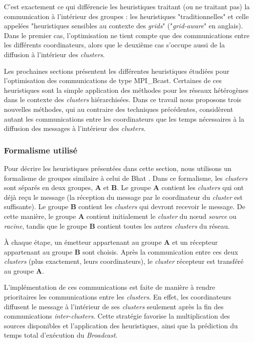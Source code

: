 C'est exactement ce qui différencie les heuristiques traitant (ou
ne traitant pas) la communication à l'intérieur des groupes : les
heuristiques "traditionnelles" et celle appelées "heuristiques
sensibles au contexte des \textit{grids}" ("\emph{grid-aware}"
en anglais). Dans le premier cas, l'optimisation ne tient compte que
des communications entre les différents coordinateurs, alors que le
deuxième cas s'occupe aussi de la diffusion à l'intérieur des  \textit{clusters}. 


Les prochaines sections présentent les différentes heuristiques étudiées
pour l'optimisation des communications de type MPI\_Bcast. Certaines
de ces heuristiques sont la simple application des méthodes pour les
réseaux hétérogènes dans le contexte des  \textit{clusters} hiérarchisées. Dans
ce travail nous proposons trois nouvelles méthodes, qui au contraire
des techniques précédentes, considèrent autant les communications
entre les coordinateurs que les temps nécessaires à la diffusion des
messages à l'intérieur des  \textit{clusters}.


\subsubsection*{Formalisme utilisé}

Pour décrire les heuristiques présentées dans cette section, nous
utilisons un formalisme de groupes similaire à celui de Bhat \cite{Bhat03}.
Dans ce formalisme, les  \textit{clusters} sont séparés en deux groupes, \textbf{A}
et \textbf{B}. Le groupe \textbf{A} contient les \textit{clusters} qui ont déjà
reçu le message (la réception du message par le coordinateur du
 \textit{cluster} est suffisante). Le groupe \textbf{B} contient les  \textit{clusters}
qui devront recevoir le message. De cette manière, le groupe \textbf{A}
contient initialement le  \textit{cluster} du n{\oe}ud \emph{source} ou \emph{racine},
tandis que le groupe \textbf{B} contient toutes les autres  \textit{clusters}
du réseau.

À chaque étape, un émetteur appartenant au groupe \textbf{A} et un
récepteur appartenant au groupe \textbf{B} sont choisis. Après la
communication entre ces deux  \textit{clusters} (plus exactement, leurs coordinateurs),
le \textit{cluster} récepteur est transféré au groupe \textbf{A}. 

L'implémentation de ces communications est faite de manière à rendre
prioritaires les communications entre les  \textit{clusters}. En effet, les coordinateurs
diffusent le message à l'intérieur de ses  \textit{clusters} seulement après
la fin des communications \textit{inter-clusters}. Cette stratégie favorise
la multiplication des sources disponibles et l'application des heuristiques,
ainsi que la prédiction du temps total d'exécution du \textit{Broadcast}.

